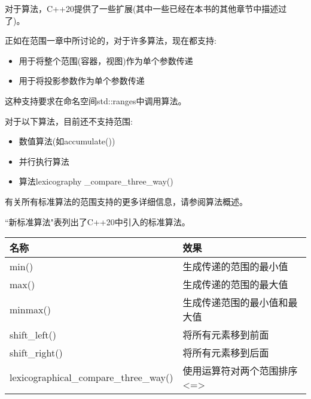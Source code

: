 

对于算法，C++20提供了一些扩展(其中一些已经在本书的其他章节中描述过了)。


正如在范围一章中所讨论的，对于许多算法，现在都支持:

\begin{itemize}
\item 
用于将整个范围(容器，视图)作为单个参数传递

\item 
用于将投影参数作为单个参数传递
\end{itemize}

这种支持要求在命名空间std::ranges中调用算法。

对于以下算法，目前还不支持范围:

\begin{itemize}
\item 
数值算法(如accumulate())

\item 
并行执行算法

\item 
算法lexicography \_compare\_three\_way()
\end{itemize}

有关所有标准算法的范围支持的更多详细信息，请参阅算法概述。


“新标准算法"表列出了C++20中引入的标准算法。

\begin{longtable}[c]{|l|l|}
\hline
\textbf{名称}  & \textbf{效果}                            \\ \hline
\endfirsthead
%
\endhead
%
min()          & 生成传递的范围的最小值 \\ \hline
max()          & 生成传递的范围的最大值 \\ \hline
minmax()       & 生成传递范围的最小值和最大值       \\ \hline
shift\_left()  & 将所有元素移到前面            \\ \hline
shift\_right() & 将所有元素移到后面             \\ \hline
lexicographical\_compare\_three\_way() & 使用运算符对两个范围排序 \textless{}=\textgreater{} \\ \hline
\end{longtable}

